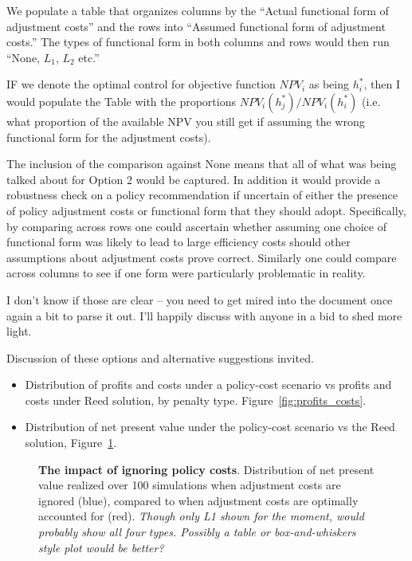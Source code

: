 \documentclass[authoryear, review, 12pt]{elsarticle}
\newcommand{\cdb}[1]{{\it \color{darkgreen} #1}}
\begin{document}
{ We populate a table that organizes columns by the ``Actual functional form of adjustment costs'' and the rows into ``Assumed functional form of adjustment costs.'' The types of functional form in both columns and rows would then run ``None, $L_1$, $L_2$ etc.''
   
 IF we denote the optimal control for objective function $NPV_i$ as being $h^*_i$, then I would populate the Table with the proportions
 $NPV_i(h^*_j) / NPV_i(h^*_i)$
 (i.e. what proportion of the available NPV you still get if assuming the wrong functional form for the adjustment costs).
   
 The inclusion of the comparison against None means that all of what was being talked about for Option 2 would be captured. In addition it would provide a robustness check on a policy recommendation if uncertain of either the presence of policy adjustment costs or functional form that they should adopt. Specifically, by comparing across rows one could ascertain whether assuming one choice of functional form was likely to lead to large efficiency costs should other assumptions about adjustment costs prove correct. Similarly one could compare across columns to see if one form were particularly problematic in reality.
   
  I don't know if those are clear – you need to get mired into the document once again a bit to parse it out. I’ll happily discuss with anyone in a bid to shed more light.
   
 Discussion of these options and alternative suggestions invited.
}



\begin{itemize}
 \item Distribution of profits and costs under a policy-cost scenario vs profits and costs under Reed solution, by penalty type. Figure~\ref{fig:profits_costs}.
 \item Distribution of net present value under the policy-cost scenario vs the Reed solution, Figure~\ref{fig:npv_dist}.  
\end{itemize}

\begin{figure}
 \begin{center}
 \caption{\textbf{The impact of ignoring policy costs}.  Distribution of net present value realized over 100 simulations when adjustment costs are ignored (blue), compared to when adjustment costs are optimally accounted for (red). \cdb{Though only L1 shown for the moment, would probably show all four types.  Possibly a table or box-and-whiskers style plot would be better?}}\label{fig:npv_dist}
 \end{center}
\end{figure}
\end{document}
